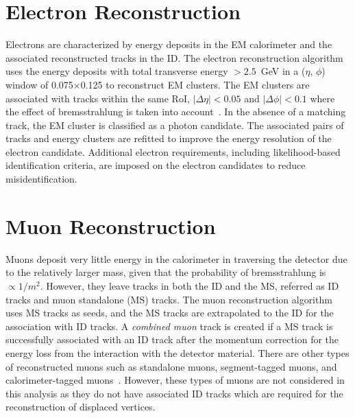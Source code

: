 \section{Electron Reconstruction}
\label{sec:reco:lep}

Electrons are characterized by energy deposits in the EM calorimeter and the associated reconstructed tracks in the ID. The electron reconstruction algorithm uses the energy deposits with total transverse energy $>2.5$~\si{\GeV} in a ($\eta$, $\phi$) window of 0.075$\times$0.125  to reconstruct EM clusters. The EM clusters are associated with tracks within the same RoI, $|\Delta\eta|<0.05$ and $|\Delta\phi|<0.1$ where the effect of bremsstrahlung is taken into account~\cite{Aad:2014fxa}. In the absence of a matching track, the EM cluster is classified as a photon candidate. The associated pairs of tracks and energy clusters are refitted to improve the energy resolution of the electron candidate. Additional electron requirements, including likelihood-based identification criteria, are imposed on the electron candidates to reduce misidentification.


\section{Muon Reconstruction}
\label{sec:reco:muon}

Muons deposit very little energy in the calorimeter in traversing the detector due to the relatively larger mass, given that the probability of bremsstrahlung is $\propto 1/m^{2}$. However, they leave tracks in both the ID and the MS, referred as ID tracks and muon standalone (MS) tracks. The muon reconstruction algorithm uses MS tracks as seeds, and the MS tracks are extrapolated to the ID for the association with ID tracks. A \textit{combined muon} track is created if a MS track is successfully associated with an ID track after the momentum correction for the energy loss from the interaction with the detector material. There are other types of reconstructed muons such as standalone muons, segment-tagged muons, and calorimeter-tagged muons~\cite{Aad:2016jkr}. However, these types of muons are not considered in this analysis as they do not have associated ID tracks which are required for the reconstruction of displaced vertices.

